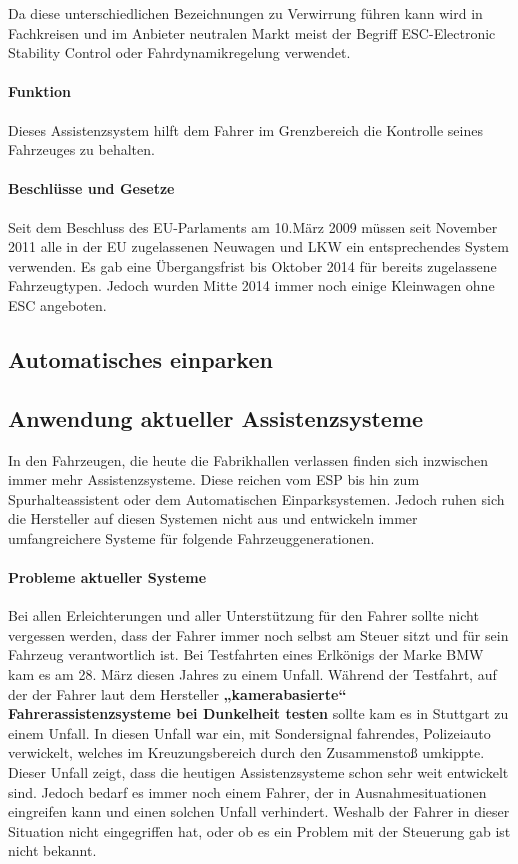 Da diese unterschiedlichen Bezeichnungen zu Verwirrung führen kann wird in Fachkreisen und im Anbieter neutralen Markt meist der Begriff ESC-Electronic Stability Control oder Fahrdynamikregelung verwendet. 
\paragraph{Funktion}Dieses Assistenzsystem hilft dem Fahrer im Grenzbereich die Kontrolle seines Fahrzeuges zu behalten. 

\paragraph{Beschlüsse und Gesetze} Seit dem Beschluss des EU-Parlaments am 10.März 2009 müssen seit November 2011 alle in der EU zugelassenen Neuwagen und LKW ein entsprechendes System verwenden. Es gab eine Übergangsfrist bis Oktober 2014 für bereits zugelassene Fahrzeugtypen. Jedoch wurden Mitte 2014 immer noch einige Kleinwagen ohne ESC angeboten. 


\subsection{Automatisches einparken}

\subsection{Anwendung aktueller Assistenzsysteme}
In den Fahrzeugen, die heute die Fabrikhallen verlassen finden sich inzwischen immer mehr Assistenzsysteme. Diese reichen vom ESP bis hin zum Spurhalteassistent oder dem Automatischen Einparksystemen. Jedoch ruhen sich die Hersteller auf diesen Systemen nicht aus und entwickeln immer umfangreichere Systeme für folgende Fahrzeuggenerationen. 
\paragraph{Probleme aktueller Systeme} Bei allen Erleichterungen und aller Unterstützung für den Fahrer sollte nicht vergessen werden, dass der Fahrer immer noch selbst am Steuer sitzt und für sein Fahrzeug verantwortlich ist. Bei Testfahrten eines Erlkönigs der Marke BMW kam es am 28. März diesen Jahres zu einem Unfall. Während der Testfahrt, auf der der Fahrer laut dem Hersteller \textbf{„kamerabasierte“ Fahrerassistenzsysteme bei Dunkelheit testen} sollte kam es in Stuttgart zu einem Unfall. In diesen Unfall war ein, mit Sondersignal fahrendes, Polizeiauto verwickelt, welches im Kreuzungsbereich durch den Zusammenstoß umkippte.
Dieser Unfall zeigt, dass die heutigen Assistenzsysteme schon sehr weit entwickelt sind. Jedoch bedarf es immer noch einem Fahrer, der in Ausnahmesituationen eingreifen kann und einen solchen Unfall verhindert. Weshalb der Fahrer in dieser Situation nicht eingegriffen hat, oder ob es ein Problem mit der Steuerung gab ist nicht bekannt.


